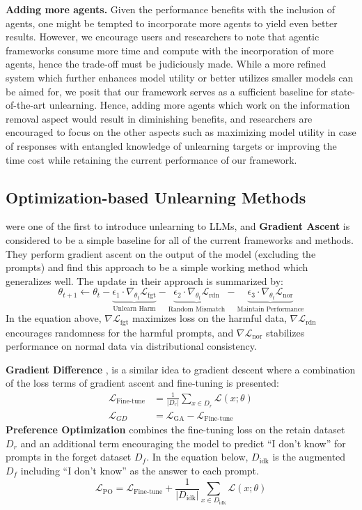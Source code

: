 \textbf{Adding more agents.} Given the performance benefits with the inclusion of agents, one might be tempted to incorporate more agents to yield even better results. However, we encourage users and researchers to note that agentic frameworks consume more time and compute with the incorporation of more agents, hence the trade-off must be judiciously made. While a more refined system which further enhances model utility or better utilizes smaller models can be aimed for, we posit that our framework serves as a sufficient baseline for state-of-the-art unlearning. Hence, adding more agents which work on the information removal aspect would result in diminishing benefits, and researchers are encouraged to focus on the other aspects such as maximizing model utility in case of responses with entangled knowledge of unlearning targets or improving the time cost while retaining the current performance of our framework.

\subsection{Optimization-based Unlearning Methods}
\citet{yao2024largelanguagemodelunlearning} were one of the first to introduce unlearning to LLMs, and \textbf{Gradient Ascent} is considered to be a simple baseline for all of the current frameworks and methods. They perform gradient ascent on the output of the model (excluding the prompts) and find this approach to be a simple working method which generalizes well. The update in their approach is summarized by: $$\theta_{t+1} \leftarrow \theta_t - \underbrace{\epsilon_1 \cdot \nabla_{\theta_t} \mathcal{L}_{\text{fgt}}}_{\text{Unlearn Harm}} - \underbrace{\epsilon_2 \cdot \nabla_{\theta_t} \mathcal{L}_{\text{rdn}}}_{\text{Random Mismatch}} - \underbrace{\epsilon_3 \cdot \nabla_{\theta_t} \mathcal{L}_{\text{nor}}}_{\text{Maintain Performance}}$$ 
In the equation above, $\nabla \mathcal{L}_{\text{fgt}}$ maximizes loss on the harmful data,  $\nabla \mathcal{L}_{\text{rdn}}$ encourages randomness for the harmful prompts, and  $\nabla \mathcal{L}_{\text{nor}}$ stabilizes performance on normal data via distributional consistency.

\textbf{Gradient Difference} \citet{fan2024salunempoweringmachineunlearning}, \cite{choi2024optoutinvestigatingentitylevelunlearning} is a similar idea to gradient descent where a combination of the loss terms of gradient ascent and fine-tuning is presented: 
\begin{align*}
\mathcal{L}_{\text{Fine-tune}} &= \frac{1}{|D_r|}\sum_{x \in D_r} \mathcal{L}(x; \theta) \\
\mathcal{L}_{GD} &= \mathcal{L}_{\text{GA}} - \mathcal{L}_{\text{Fine-tune}}
\end{align*}
\textbf{Preference Optimization} \citet{liu2024largelanguagemodelunlearning} combines the fine-tuning loss on the retain dataset $D_r$ and an additional term encouraging the model to predict \enquote{I don't know} for prompts in the forget dataset $D_f$. In the equation below, $D_{\text{idk}}$ is the augmented $D_f$ including \enquote{I don't know} as the answer to each prompt. $$\mathcal{L}_{\text{PO}} = \mathcal{L}_{\text{Fine-tune}} + \frac{1}{|D_{\text{idk}}|} \sum_{x \in D_{\text{idk}}} \mathcal{L}(x; \theta)$$

